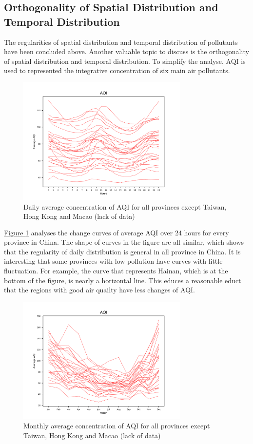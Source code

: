 \documentclass[letterpaper]{article}
\begin{document}
\begin{CJK*}{UTF8}{gkai}
  \section{Orthogonality of Spatial Distribution and Temporal Distribution}

  The regularities of spatial distribution and temporal distribution of pollutants have been concluded above. Another valuable topic to discuss is the orthogonality of spatial distribution and temporal distribution. To simplify the analyse, AQI is used to represented the integrative concentration of six main air pollutants.

  \begin{figure}[h]
    \includegraphics[width = 8.5cm]{dailyavg_pro_pltn.png}
    \caption{Daily average concentration of AQI for all provinces except Taiwan, Hong Kong and Macao (lack of data)}
    \label{figure:5}
  \end{figure}

  \hyperref[figure:5]{Figure \ref*{figure:5}} analyses the change curves of average AQI over 24 hours for every province in China. The shape of curves in the figure are all similar, which shows that the regularity of daily distribution is general in all province in China. It is interesting that some provinces with low pollution have curves with little fluctuation. For example, the curve that represents Hainan, which is at the bottom of the figure, is nearly a horizontal line. This educes a reasonable educt that the regions with good air quailty have less changes of AQI.

  \begin{figure}[h]
    \includegraphics[width = 8.5cm]{monavg_pro_pltn.png}
    \caption{Monthly average concentration of AQI for all provinces except Taiwan, Hong Kong and Macao (lack of data)}
    \label{figure:6}
  \end{figure}


\end{CJK*}
\end{document}
